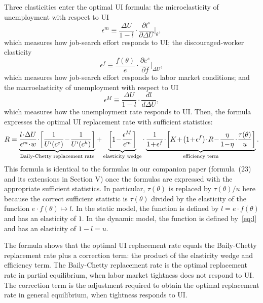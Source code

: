 \documentclass[letterpaper,12pt,leqno]{article}
\newcommand{\pre}[1]{\left( #1 \right)}
\newcommand{\brk}[1]{\left[ #1 \right]}
\newcommand{\derwrt}[3]{\frac{\partial #1}{\partial #2}\bigg\vert_{#3}}
\def \D{{\Delta}}
\def \e{{\epsilon}}
\def \t{{\theta}}
\begin{document}
Three elasticities enter the optimal UI formula: the microelasticity of unemployment with respect to UI
\begin{equation*}
\e^m \equiv \frac{\D U}{1-l} \cdot \derwrt{l^{s}}{\D U}{\t},
\end{equation*}
which measures how job-search effort responds to UI; the discouraged-worker elasticity
\begin{equation*}
\e^{f} \equiv  \frac{f(\t)}{e}\cdot \derwrt{e^{s}}{f}{\D U},
\end{equation*}
which measures how job-search effort responds to labor market conditions; and the macroelasticity of unemployment with respect to UI
\begin{equation*}
\e^M \equiv \frac{\D U}{1-l} \cdot \frac{dl}{d\D U},
\end{equation*}
which measures how the unemployment rate responds to UI. Then, the formula expresses the optimal UI replacement rate with sufficient statistics:
\begin{equation}\medmuskip=1mu 
R = \underbrace{\frac{l \cdot \D U}{\e^{m}\cdot  w} \cdot \brk{\frac{1}{U'(c^{e})}-\frac{1}{U'(c^{h})}}}_{\text{Baily-Chetty replacement rate}}+\underbrace{\brk{1-\frac{\e^{M}}{\e^{m}}}}_{\text{elasticity wedge}} \cdot  \underbrace{\frac{1}{1+\e^f}  \cdot  \brk{K+\pre{1+\e^{f}}\cdot  R-\frac{\eta}{1-\eta} \cdot \frac{\tau(\t)}{u}}}_{\text{efficiency term}}.
\label{eq:optimal}\end{equation}
This formula is identical to the formulas in our companion paper (formula~(23) and its extensions in Section V) once the formulas are expressed with the appropriate sufficient statistics. In particular, $\tau(\t)$ is replaced by $\tau(\t)/u$ here because the correct sufficient statistic is $\tau(\t)$ divided by the elasticity of the function $e\cdot f(\t)\mapsto l$. In the static model, the function is defined by $l=e\cdot f(\t)$ and has an elasticity of $1$. In the dynamic model, the function is defined by~\eqref{eq:l} and has an elasticity of $1-l=u$.

The formula shows that the optimal UI replacement rate equals the Baily-Chetty replacement rate plus a correction term: the product of the elasticity wedge and efficiency term. The Baily-Chetty replacement rate is the optimal replacement rate in partial equilibrium, when labor market tightness does not respond to UI. The correction term is the adjustment required to obtain the optimal replacement rate in general equilibrium, when tightness responds to UI.
\end{document}
